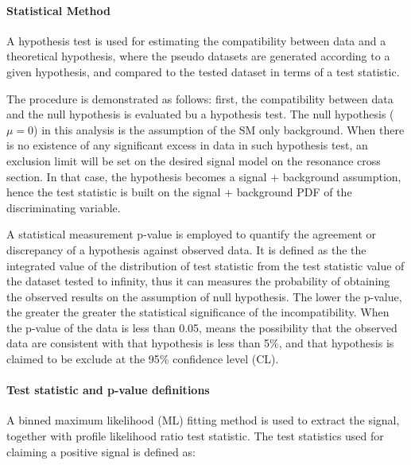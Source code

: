 \paragraph{Statistical Method\\}

A hypothesis test is used for estimating the compatibility between data and a theoretical hypothesis, where the pseudo datasets are generated according to a given hypothesis, and compared to the tested dataset in terms of a test statistic.

The procedure is demonstrated as follows: first, the compatibility
between data and the null hypothesis is evaluated bu a hypothesis test. The null hypothesis ($\mu = 0$) in this analysis is the assumption of the SM only background. When there is no existence of any significant excess in
data in such hypothesis test, an exclusion limit will be
set on the desired signal model on the \mjj resonance cross section. In that case, the hypothesis becomes a signal + background  assumption, hence the test statistic is built
on the signal + background PDF of the discriminating variable.

A statistical measurement p-value is employed to quantify the agreement or discrepancy of a hypothesis against observed data. It is defined as the the integrated value of the distribution of test statistic from the test
statistic value of the dataset tested to infinity, thus it can measures the probability of obtaining the observed results on the assumption of null hypothesis. The lower the p-value, the greater the greater the statistical significance of the incompatibility. When the p-value of the data is less than 0.05, means the possibility that the
observed data are consistent with that hypothesis is less than 5\%, and that hypothesis is claimed to be exclude at the 95\% confidence level (CL).


\paragraph{Test statistic and p-value definitions\\}

A binned maximum likelihood (ML) fitting method is used to extract the signal, together with profile likelihood ratio test statistic. The test statistics used for claiming a positive signal is defined as:


